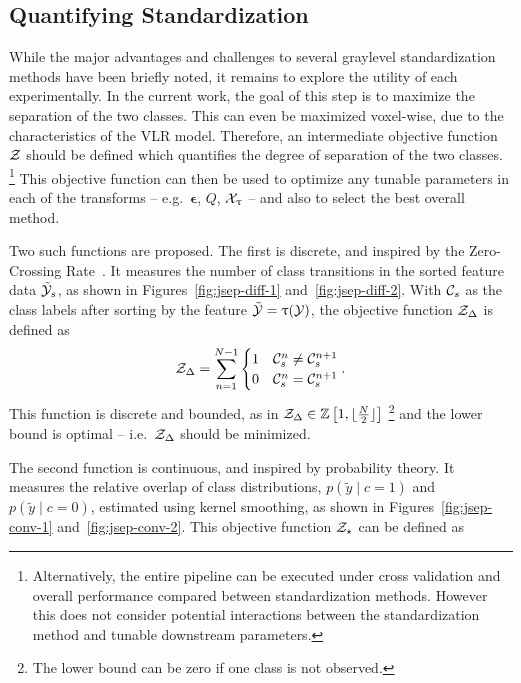 \subsection{Quantifying Standardization}
While the major advantages and challenges to several graylevel standardization methods
have been briefly noted, it remains to explore the utility of each experimentally.
In the current work, the goal of this step is to maximize the separation of the two classes.
This can even be maximized voxel-wise, due to the characteristics of the VLR model.
Therefore, an intermediate objective function $\mathcal{Z}$ should be defined
which quantifies the degree of separation of the two classes.%
\footnote{Alternatively, the entire pipeline can be executed under cross validation
  and overall performance compared between standardization methods.
However this does not consider potential interactions
between the standardization method and tunable downstream parameters.}
This objective function can then be used to optimize
any tunable parameters in each of the transforms
-- e.g.\ $\bm{\epsilon}$, $Q$, $\mathcal{X}_{\uptau}$ -- 
and also to select the best overall method.
\par
Two such functions are proposed.
The first is discrete, and inspired by the Zero-Crossing Rate~\cite{Kedem1986}.
It measures the number of class transitions in the sorted feature data $\tilde{\mathcal{Y}}_s$,
as shown in Figures~\ref{fig:jsep-diff-1} and~\ref{fig:jsep-diff-2}.
With $\mathcal{C}_s$ as the class labels after sorting by the feature $\tilde{\mathcal{Y}} = \uptau(\mathcal{Y})$,
the objective function $\mathcal{Z}_{\Delta}$ is defined as
\begin{equation}
  \Z_{\Delta} = \sum_{n=1}^{N-1}
     \begin{cases}
      1 & \C_s^{n} \ne \C_s^{n+1}\\
      0 & \C_s^{n}  =  \C_s^{n+1}
    \end{cases}.%
    \label{eq:zsep-diff}
\end{equation}
This function is discrete and bounded, as in
$\mathcal{Z}_{\Delta}\in\mathbb{Z}\left[1,\lfloor\frac{N}{2}\rfloor\right]$%
\footnote{The lower bound can be zero if one class is not observed.}
and the lower bound is optimal -- i.e.\ $\mathcal{Z}_{\Delta}$ should be minimized.
\par
The second function is continuous, and inspired by probability theory.
It measures the relative overlap of class distributions,
$p(\tilde{y}\mid c=1)$ and $p(\tilde{y}\mid c=0)$,
estimated using kernel smoothing,
as shown in Figures~\ref{fig:jsep-conv-1} and~\ref{fig:jsep-conv-2}.
This objective function $\mathcal{Z}_{\star}$ can be defined as
